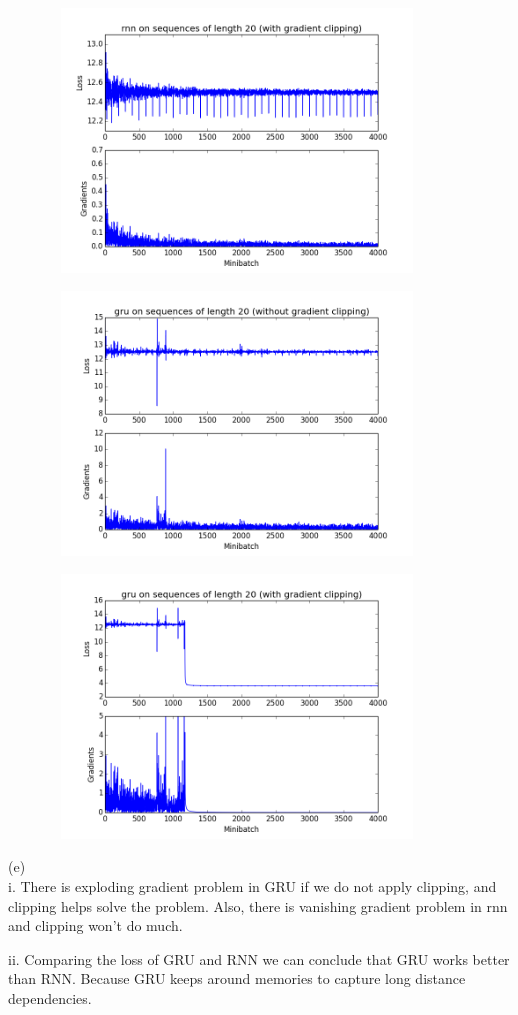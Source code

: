 \documentclass{article}
\theoremstyle{definition}
\theoremstyle{remark}
\numberwithin{equation}{section}
\begin{document}
  \begin{figure}[H] 
  \centering
 \includegraphics[width=100mm, height=70mm]{fig/q3-clip-rnn.png}
   \caption{}
   \label{fig: clip_rnn}
 \end{figure}
 
  \begin{figure}[H] 
  \centering
 \includegraphics[width=100mm, height=70mm]{fig/q3-noclip-gru.png}
   \caption{}
   \label{fig: noclip_gru}
 \end{figure}
 
  \begin{figure}[H] 
  \centering
 \includegraphics[width=100mm, height=70mm]{fig/q3-clip-gru.png}
   \caption{}
   \label{fig: clip_gru}
 \end{figure}
\newpage
(e)\\
 i. There is exploding gradient problem in GRU if we do not apply clipping, and clipping helps solve the problem. Also, there is vanishing gradient problem in rnn and clipping won't do much.
 
 \vspace{10pt}
 
 ii. Comparing the loss of GRU and RNN we can conclude that GRU works better than RNN. Because GRU keeps around memories to capture long distance dependencies. 
 
\end{document}
